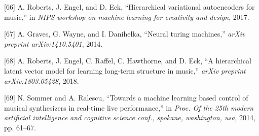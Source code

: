 \documentclass[12pt,]{article}
\begin{document}
\leavevmode\hypertarget{ref-roberts2017hierarchical}{}%
{[}66{]} A. Roberts, J. Engel, and D. Eck, ``Hierarchical variational
autoencoders for music,'' in \emph{NIPS workshop on machine learning for
creativity and design}, 2017.

\leavevmode\hypertarget{ref-graves2014neural}{}%
{[}67{]} A. Graves, G. Wayne, and I. Danihelka, ``Neural turing
machines,'' \emph{arXiv preprint arXiv:1410.5401}, 2014.

\leavevmode\hypertarget{ref-roberts2018hierarchical}{}%
{[}68{]} A. Roberts, J. Engel, C. Raffel, C. Hawthorne, and D. Eck, ``A
hierarchical latent vector model for learning long-term structure in
music,'' \emph{arXiv preprint arXiv:1803.05428}, 2018.

\leavevmode\hypertarget{ref-sommer2014towards}{}%
{[}69{]} N. Sommer and A. Ralescu, ``Towards a machine learning based
control of musical synthesizers in real-time live performance,'' in
\emph{Proc. Of the 25th modern artificial intelligence and cognitive
science conf., spokane, washington, usa}, 2014, pp. 61--67.
\end{document}
